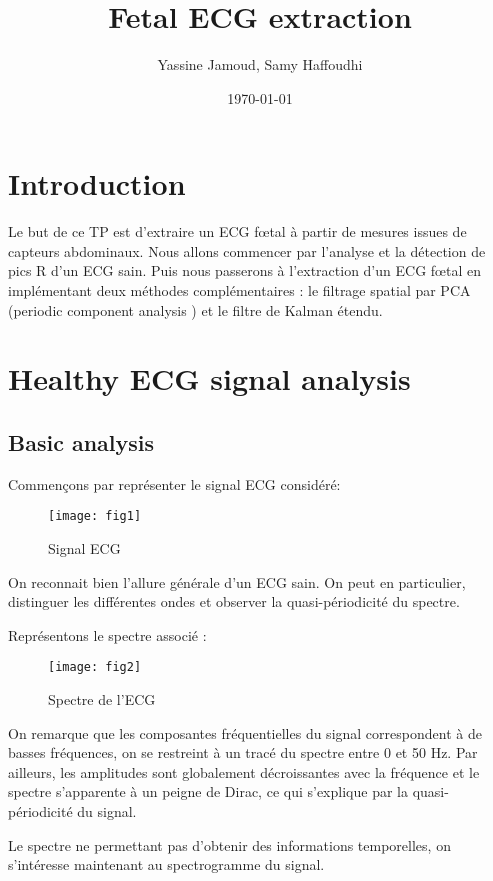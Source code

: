 \documentclass[12pt,a4paper,titlepage]{article}
\title{Fetal ECG extraction}
\author{Yassine Jamoud, Samy Haffoudhi}
\date{\today}
\begin{document}
\maketitle

\section*{Introduction}

Le but de ce TP est d'extraire un ECG fœtal à partir de mesures issues de capteurs abdominaux.
Nous allons commencer par l'analyse et la détection de pics R d'un ECG sain. Puis nous 
passerons à l'extraction d'un ECG fœtal en implémentant deux méthodes complémentaires : 
le filtrage spatial par PCA (periodic component analysis ) et le filtre de Kalman étendu.

\section{Healthy ECG signal analysis}

\subsection{Basic analysis}

Commençons par représenter le signal ECG considéré:

\begin{figure}[H]
    \caption{Signal ECG}
    \texttt{[image: fig1]}
    \centering
\end{figure}

On reconnait bien l'allure générale d'un ECG sain. On peut en particulier, distinguer les 
différentes ondes et observer la quasi-périodicité du spectre.

Représentons le spectre associé :

\begin{figure}[H]
    \caption{Spectre de l'ECG}
    \texttt{[image: fig2]}
    \centering
\end{figure}

On remarque que les composantes fréquentielles du signal correspondent à de basses
fréquences, on se restreint à un tracé du spectre entre 0 et 50 Hz. Par ailleurs, les
amplitudes sont globalement décroissantes avec la fréquence et le spectre s'apparente 
à un peigne de Dirac, ce qui s'explique par la quasi-périodicité du signal.

Le spectre ne permettant pas d'obtenir des informations temporelles, on s'intéresse 
maintenant au spectrogramme du signal.
\end{document}
